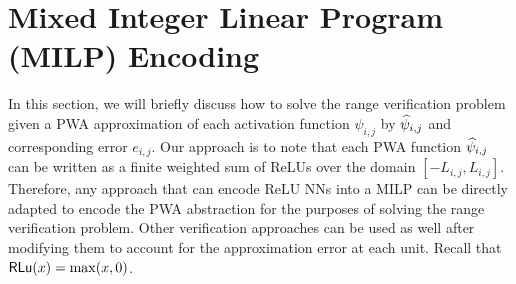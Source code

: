 \section{Mixed Integer Linear Program (MILP) Encoding}\label{sec:milp-formulation}

In this section, we will briefly discuss how to solve the range verification problem given a PWA approximation of each activation function $\psi_{i,j}$ by $\widehat{\psi}_{i,j}$ and corresponding error $e_{i,j}$. Our approach is to note that each PWA function $\widehat{\psi}_{i,j}$ can be written as a finite weighted sum of ReLUs over the domain $[-L_{i,j}, L_{i,j}]$. Therefore, any approach that can encode ReLU NNs into a MILP can be directly adapted to encode the PWA abstraction for the purposes of solving the range verification problem. Other verification approaches  can be used as well after modifying them to account for the approximation error at each unit.  Recall that $\mathsf{RLu}(x) = \max(x, 0)$.

